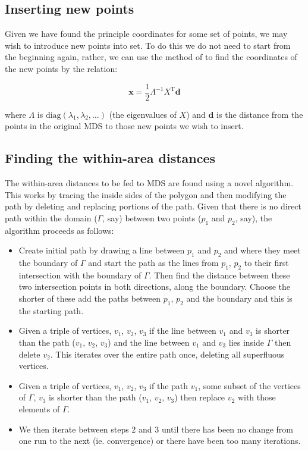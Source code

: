 \documentclass[a4paper,10pt]{amsart}
\newcommand{\tr}[1]{#1^{\text{T}}}
\newcommand{\diag}{\text{diag}}
\begin{document}
\subsection{Inserting new points}

Given we have found the principle coordinates for some set of points, we may wish to introduce new points into set. To do this we do not need to start from the beginning again, rather, we can use the method of \cite{gower1968} to find the coordinates of the new points by the relation:

\begin{equation*}
\mathbf{x} = \frac{1}{2} \Lambda^{-1} \tr{X} \mathbf{d}
\end{equation*}

where $\Lambda$ is $\diag(\lambda_1, \lambda_2, \dots)$ (the eigenvalues of $X$) and $\mathbf{d}$ is the distance from the points in the original MDS to those new points we wish to insert.



\subsection{Finding the within-area distances}

The within-area distances to be fed to MDS are found using a novel algorithm. This works by tracing the inside sides of the polygon and then modifying the path by deleting and replacing portions of the path. Given that there is no direct path within the domain ($\Gamma$, say) between two points ($p_1$ and $p_2$, say), the algorithm proceeds as follows:

\begin{itemize}
\item Create initial path by drawing a line between $p_1$ and $p_2$ and where they meet the boundary of $\Gamma$ and start the path as the lines from $p_1$, $p_2$ to their first intersection with the boundary of $\Gamma$. Then find the distance between these two intersection points in both directions, along the boundary. Choose the shorter of these add the paths between $p_1$, $p_2$ and the boundary and this is the starting path. 
\item Given a triple of vertices, $v_1$, $v_2$, $v_3$ if the line between $v_1$ and $v_3$ is shorter than the path ($v_1$, $v_2$, $v_3$) and the line between $v_1$ and $v_3$ lies inside $\Gamma$ then delete $v_2$. This iterates over the entire path once, deleting all superfluous vertices. 
\item Given a triple of vertices, $v_1$, $v_2$, $v_3$ if the path $v_1$, some subset of the vertices of $\Gamma$, $v_3$ is shorter than the path ($v_1$, $v_2$, $v_3$) then replace $v_2$ with those elements of $\Gamma$. 
\item We then iterate between steps 2 and 3 until there has been no change from one run to the next (ie. convergence) or there have been too many iterations.
\end{itemize}
\end{document}
